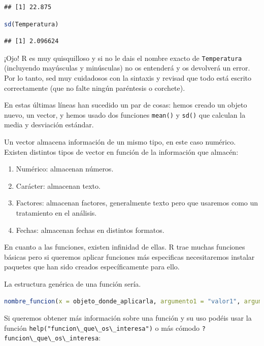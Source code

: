 \documentclass[
]{book}
\newcommand{\passthrough}[1]{#1}
\providecommand{\tightlist}{%
  \setlength{\itemsep}{0pt}\setlength{\parskip}{0pt}}
\begin{document}
\begin{lstlisting}
## [1] 22.875
\end{lstlisting}

\begin{lstlisting}[language=R]
sd(Temperatura)
\end{lstlisting}

\begin{lstlisting}
## [1] 2.096624
\end{lstlisting}

¡Ojo! R es muy quisquilloso y si no le dais el nombre exacto de \passthrough{\lstinline!Temperatura!} (incluyendo mayúsculas y minúsculas) no os entenderá y os devolverá un error. Por lo tanto, sed muy cuidadosos con la sintaxis y revisad que todo está escrito correctamente (que no falte ningún paréntesis o corchete).

En estas últimas líneas han sucedido un par de cosas: hemos creado un objeto nuevo, un vector, y hemos usado dos funciones \passthrough{\lstinline!mean()!} y \passthrough{\lstinline!sd()!} que calculan la media y desviación estándar.

Un vector almacena información de un mismo tipo, en este caso numérico. Existen distintos tipos de vector en función de la información que almacén:

\begin{enumerate}
\def\labelenumi{\arabic{enumi}.}
\tightlist
\item
  Numérico: almacenan números.
\item
  Carácter: almacenan texto.
\item
  Factores: almacenan factores, generalmente texto pero que usaremos como un tratamiento en el análisis.
\item
  Fechas: almacenan fechas en distintos formatos.
\end{enumerate}

En cuanto a las funciones, existen infinidad de ellas. R trae muchas funciones básicas pero si queremos aplicar funciones más especificas necesitaremos instalar paquetes que han sido creados específicamente para ello.

La estructura genérica de una función sería.

\begin{lstlisting}[language=R]
nombre_funcion(x = objeto_donde_aplicarla, argumento1 = "valor1", argumento2 = "valor2")
\end{lstlisting}

Si queremos obtener más información sobre una función y su uso podéis usar la función \passthrough{\lstinline!help("funcion\_que\_os\_interesa")!} o más cómodo \passthrough{\lstinline!?funcion\_que\_os\_interesa!}:
\end{document}
